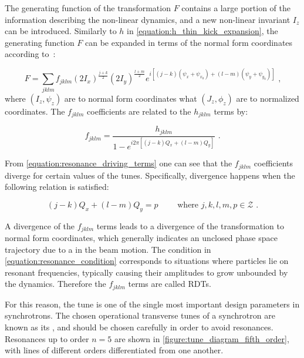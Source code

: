 The generating function of the transformation \(F\) contains a large portion of the information describing the non-linear dynamics, and a new non-linear invariant \(I_z\) can be introduced. 
Similarly to \(h\) in \cref{equation:h_thin_kick_expansion}, the generating function \(F\) can be expanded in terms of the normal form coordinates according to~\cite{PHD:Franchi}:

\begin{equation}
    F = \sum_{jklm} f_{jklm} \left( 2 I_x \right)^{\frac{j+k}{2}} \left(2 I_y \right)^{\frac{l+m}{2}} e^{i \left[ (j-k) \left( \psi_x + \psi_{x_0} \right) + (l-m) \left( \psi_y + \psi_{y_0} \right) \right]} \text{ ,}
    \label{equation:generating_function_expansion}
\end{equation}
where \((I_z, \psi_z)\) are to normal form coordinates what \((J_z, \phi_z)\) are to normalized coordinates.
The \(f_{jklm}\) coefficients are related to the \(h_{jklm}\) terms by:

\begin{equation}
    f_{jklm} = \frac{h_{jklm}}{1 - e^{i 2 \pi \left[ \left(j-k\right) Q_x + \left(l-m\right) Q_y \right]}} \text{ .}
    \label{equation:resonance_driving_terms}
\end{equation}

From \cref{equation:resonance_driving_terms} one can see that the \(f_{jklm}\) coefficients diverge for certain values of the tunes.
Specifically, divergence happens when the following relation is satisfied:

\begin{equation}
    \left(j-k\right) Q_x + \left(l-m\right) Q_y = p \quad \quad \text { where } j, k, l, m, p \in \mathcal{Z} \text{ .}
    \label{equation:resonance_condition}
\end{equation}

A divergence of the \(f_{jklm}\) terms leads to a divergence of the transformation to normal form coordinates, which generally indicates an unclosed phase space trajectory due to a  in the beam motion.
The condition in \cref{equation:resonance_condition} corresponds to situations where particles lie on resonant frequencies, typically causing their amplitudes to grow unbounded by the dynamics.
Therefore the \(f_{jklm}\) terms are called \glspl{RDT}.

For this reason, the tune is one of the single most important design parameters in synchrotrons.
The chosen operational transverse tunes of a synchrotron are known as its , and should be chosen carefully in order to avoid resonances.
Resonances up to order \(n = 5\) are shown in \cref{figure:tune_diagram_fifth_order}, with lines of different orders differentiated from one another.

